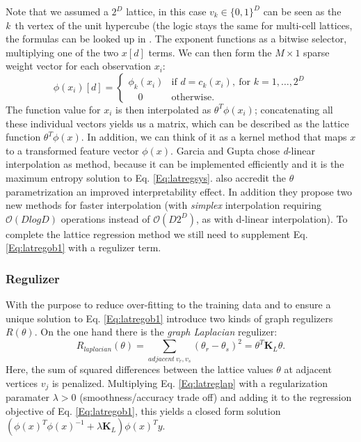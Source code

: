 Note that we assumed a $2^D$ lattice, in this case $v_k \in \{0,1\}^D$ can be seen as the \textit{k}\ th vertex of the unit hypercube (the logic stays the same for multi-cell lattices, the formulas can be looked up in \citep{garcia2012optimized}. The exponent functions as a bitwise selector, multiplying one of the two $x[d]$ terms. We can then form the $M \times 1$ sparse weight vector for each observation $x_i$:
\begin{equation}
	\phi(x_i)[d] = \begin{cases}
	\phi_k(x_i) & \text{if } d = c_k(x_i),\ \text{for } k = 1, \dots, 2^D\\
	 \mspace{18mu} 0 &  \text{otherwise}.
	\end{cases}
\end{equation}
The function value for $x_i$ is then interpolated as $\theta^T \phi(x_i)$; concatenating all these individual vectors yields us a matrix, which can be described as the lattice function $\theta^T \phi(x)$. In addition, we can think of it as a kernel method that maps $x$ to a transformed feature vector $\phi(x)$. Garcia and Gupta chose \textit{d}-linear interpolation as method, because it can be implemented efficiently and it is the maximum entropy solution to Eq. \ref{Eq:latregsys}. \citep{gupta2016monotonic} also accredit the $\theta$ parametrization an improved interpretability effect. In addition they propose two new methods for faster interpolation (with \textit{simplex} interpolation requiring $\mathcal{O}(D log D)$ operations instead of $\mathcal{O}(D2^D)$, as with d-linear interpolation). To complete the lattice regression method we still need to supplement Eq. \ref{Eq:latregob1} with a regulizer term.

\subsubsection{Regulizer}

With the purpose to reduce over-fitting to the training data and to ensure a unique solution to Eq. \ref{Eq:latregob1} \citep{garcia2012optimized} introduce two kinds of graph regulizers $R(\theta)$. On the one hand there is the \textit{graph Laplacian} regulizer: 
\begin{equation}
	R_{laplacian}(\theta) = \sum_{adjacent\ v_r, v_s} 
	(\theta_r - \theta_s)^2 
	= \theta^T\mathbf{K}_L\theta.
	\label{Eq:latreglap}
\end{equation}
Here, the sum of squared differences between the lattice values $\theta$ at adjacent vertices $v_j$ is penalized.  Multiplying Eq. \ref{Eq:latreglap} with a regularization paramater $\lambda > 0$ (smoothness/accuracy trade off) and adding it to the regression objective of Eq. \ref{Eq:latregob1}, this yields a closed form solution $(\phi(x)^T\phi(x)^{-1} + \lambda \mathbf{K}_L)\phi(x)^T y$. %

